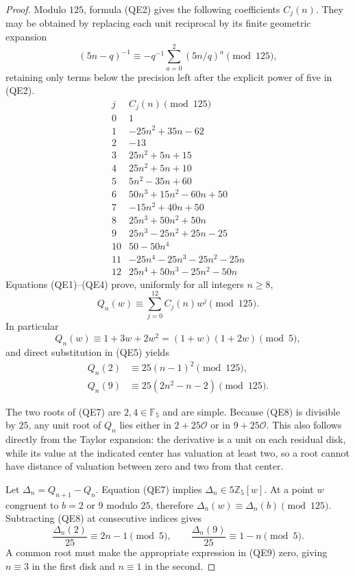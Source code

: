 \documentclass[11pt]{article}
\begin{document}
\begin{proof}
Modulo $125$, formula (QE2) gives the following coefficients
$C_j(n)$. They may be obtained by replacing each unit reciprocal
by its finite geometric expansion
\[
 (5n-q)^{-1}\equiv
 -q^{-1}\sum_{a=0}^{2}(5n/q)^a\pmod{125},
\]
retaining only terms below the precision left after the explicit
power of five in (QE2).
\[
\begin{array}{c|l}
j&C_j(n)\pmod{125}\\ \hline
0&1\\
1&-25n^2+35n-62\\
2&-13\\
3&25n^2+5n+15\\
4&25n^2+5n+10\\
5&5n^2-35n+60\\
6&50n^3+15n^2-60n+50\\
7&-15n^2+40n+50\\
8&25n^3+50n^2+50n\\
9&25n^3-25n^2+25n-25\\
10&50-50n^4\\
11&-25n^4-25n^3-25n^2-25n\\
12&25n^4+50n^3-25n^2-50n
\end{array}                                             \tag{QE5}
\]
Equations (QE1)--(QE4) prove, uniformly for all integers $n\ge8$,
\[
 Q_n(w)\equiv\sum_{j=0}^{12}C_j(n)w^j\pmod{125}.
                                                        \tag{QE6}
\]
In particular
\[
 Q_n(w)\equiv1+3w+2w^2=(1+w)(1+2w)\pmod5,                \tag{QE7}
\]
and direct substitution in (QE5) yields
\[
 \begin{split}
 Q_n(2)&\equiv25(n-1)^2\pmod{125},\\
 Q_n(9)&\equiv25(2n^2-n-2)\pmod{125}.
 \end{split}                                            \tag{QE8}
\]

The two roots of (QE7) are $2,4\in\mathbb F_5$ and are simple.
Because (QE8) is divisible by $25$, any unit root of $Q_n$
lies either in $2+25\mathcal O$ or in $9+25\mathcal O$.
This also follows directly from the Taylor expansion: the
derivative is a unit on each residual disk, while its value at
the indicated center has valuation at least two, so a root
cannot have distance of valuation between zero and two from
that center.

Let $\Delta_n=Q_{n+1}-Q_n$. Equation (QE7) implies
$\Delta_n\in5\mathbb Z_5[w]$. At a point $w$ congruent to
$b=2$ or $9$ modulo $25$, therefore
$\Delta_n(w)\equiv\Delta_n(b)\pmod{125}$.
Subtracting (QE8) at consecutive indices gives
\[
 \frac{\Delta_n(2)}{25}\equiv2n-1\pmod5,\qquad
 \frac{\Delta_n(9)}{25}\equiv1-n\pmod5.                   \tag{QE9}
\]
A common root must make the appropriate expression in (QE9)
zero, giving $n\equiv3$ in the first disk and $n\equiv1$
in the second.
\end{proof}
\end{document}
